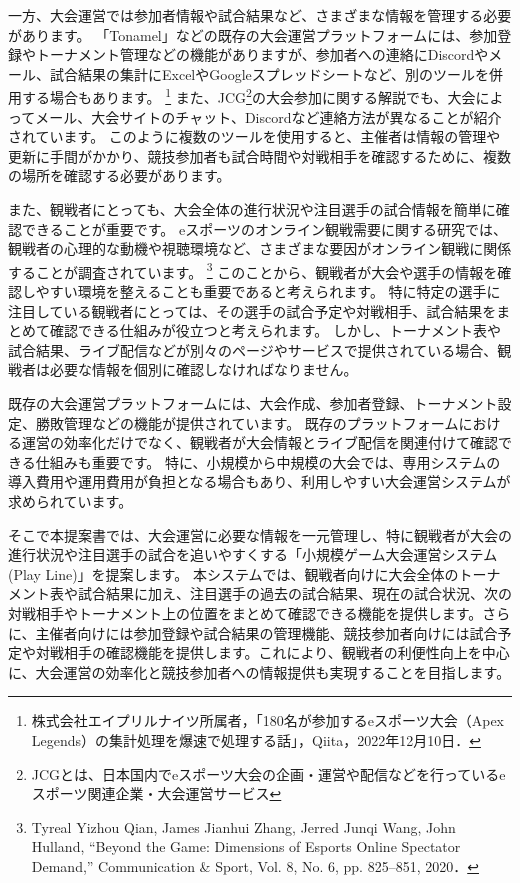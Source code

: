 一方、大会運営では参加者情報や試合結果など、さまざまな情報を管理する必要があります。
「Tonamel」などの既存の大会運営プラットフォームには、参加登録やトーナメント管理などの機能がありますが、参加者への連絡にDiscordやメール、試合結果の集計にExcelやGoogleスプレッドシートなど、別のツールを併用する場合もあります。
\footnote[3]{株式会社エイプリルナイツ所属者，「180名が参加するeスポーツ大会（Apex Legends）の集計処理を爆速で処理する話」，Qiita，2022年12月10日． }
また、JCG\footnote[4]{JCGとは、日本国内でeスポーツ大会の企画・運営や配信などを行っているeスポーツ関連企業・大会運営サービス}の大会参加に関する解説でも、大会によってメール、大会サイトのチャット、Discordなど連絡方法が異なることが紹介されています。
このように複数のツールを使用すると、主催者は情報の管理や更新に手間がかかり、競技参加者も試合時間や対戦相手を確認するために、複数の場所を確認する必要があります。

また、観戦者にとっても、大会全体の進行状況や注目選手の試合情報を簡単に確認できることが重要です。
eスポーツのオンライン観戦需要に関する研究では、観戦者の心理的な動機や視聴環境など、さまざまな要因がオンライン観戦に関係することが調査されています。
\footnote[5]{Tyreal Yizhou Qian, James Jianhui Zhang, Jerred Junqi Wang, John Hulland, “Beyond the Game: Dimensions of Esports Online Spectator Demand,” Communication & Sport, Vol. 8, No. 6, pp. 825–851, 2020．}
このことから、観戦者が大会や選手の情報を確認しやすい環境を整えることも重要であると考えられます。
特に特定の選手に注目している観戦者にとっては、その選手の試合予定や対戦相手、試合結果をまとめて確認できる仕組みが役立つと考えられます。
しかし、トーナメント表や試合結果、ライブ配信などが別々のページやサービスで提供されている場合、観戦者は必要な情報を個別に確認しなければなりません。

既存の大会運営プラットフォームには、大会作成、参加者登録、トーナメント設定、勝敗管理などの機能が提供されています。
既存のプラットフォームにおける運営の効率化だけでなく、観戦者が大会情報とライブ配信を関連付けて確認できる仕組みも重要です。
特に、小規模から中規模の大会では、専用システムの導入費用や運用費用が負担となる場合もあり、利用しやすい大会運営システムが求められています。

そこで本提案書では、大会運営に必要な情報を一元管理し、特に観戦者が大会の進行状況や注目選手の試合を追いやすくする「小規模ゲーム大会運営システム(Play Line)」を提案します。
本システムでは、観戦者向けに大会全体のトーナメント表や試合結果に加え、注目選手の過去の試合結果、現在の試合状況、次の対戦相手やトーナメント上の位置をまとめて確認できる機能を提供します。さらに、主催者向けには参加登録や試合結果の管理機能、競技参加者向けには試合予定や対戦相手の確認機能を提供します。これにより、観戦者の利便性向上を中心に、大会運営の効率化と競技参加者への情報提供も実現することを目指します。
